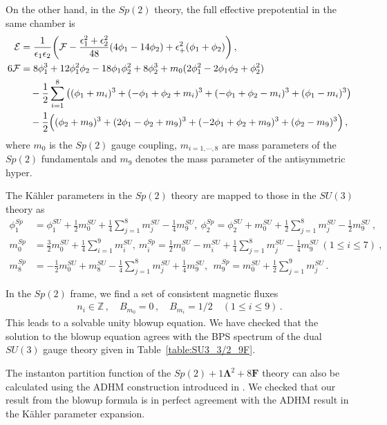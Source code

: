 On the other hand, in the $ Sp(2) $ theory, the full effective prepotential in the same chamber is
\begin{align}
\mathcal{E}& = \frac{1}{\epsilon_1 \epsilon_2} \qty(\mathcal{F} - \frac{\epsilon_1^2 + \epsilon_2^2}{48} \qty(4\phi_1 - 14\phi_2) +  \epsilon_+^2 (\phi_1 + \phi_2) ) \,,  \\
6\mathcal{F}
&= 8\phi_1^3 + 12\phi_1^2 \phi_2 - 18\phi_1 \phi_2^2 + 8\phi_2^3 + m_0 (2\phi_1^2 - 2\phi_1 \phi_2 + \phi_2^2)  \nonumber \\
& \quad - \frac{1}{2} \sum_{i=1}^8 \qty((\phi_1 + m_i)^3 + (-\phi_1 + \phi_2 + m_i)^3 + (-\phi_1 + \phi_2 - m_i)^3 + (\phi_1 - m_i)^3) \nonumber \\
& \quad - \frac{1}{2} \Big((\phi_2 + m_9)^3 + (2\phi_1 - \phi_2 + m_9)^3 + (-2\phi_1 + \phi_2 + m_9)^3 + (\phi_2 - m_9)^3\Big) \nonumber \, ,
\end{align}
where $ m_0 $ is the $Sp(2)$ gauge coupling, $ m_{i=1, \cdots, 8} $ are mass parameters of the $Sp(2)$ fundamentals and $ m_9 $ denotes the mass parameter of the antisymmetric hyper.

The K\"ahler parameters in the $Sp(2)$ theory are mapped to those in the $ SU(3) $ theory as
\begin{align}
\phi_1^{Sp} &= \phi_1^{SU} + \frac{1}{2} m_0^{SU} + \frac{1}{4} \sum_{j=1}^8 m_j^{SU} - \frac{1}{4} m_9^{SU} , \
\phi_2^{Sp} = \phi_2^{SU} + m_0^{SU} + \frac{1}{2} \sum_{j=1}^8 m_j^{SU} - \frac{1}{2} m_9^{SU}\ , \nonumber \\
m_0^{Sp} &= \frac{3}{2} m_0^{SU} + \frac{1}{4} \sum_{i=1}^9 m_i^{SU} , \ 
m_i^{Sp} = \frac{1}{2} m_0^{SU} - m_i^{SU} + \frac{1}{4} \sum_{j=1}^8 m_j^{SU} - \frac{1}{4} m_9^{SU} \ (1 \leq i \leq 7)\ ,  \nonumber \\
m_8^{Sp} &= -\frac{1}{2} m_0^{SU} + m_8^{SU} - \frac{1}{4} \sum_{j=1}^8 m_j^{SU} + \frac{1}{4} m_9^{SU} , \ \
m_9^{Sp} = m_0^{SU} + \frac{1}{2} \sum_{j=1}^9 m^{SU}_j \, .
\end{align}

In the $Sp(2)$ frame, we find a set of consistent magnetic fluxes
\begin{align}
n_i \in \mathbb{Z} \, , \quad
B_{m_0} = 0 \, , \quad
B_{m_i} = 1/2 \quad  (1 \leq i \leq 9) \, .
\end{align}
This leads to a solvable unity blowup equation. We have checked that the solution to the blowup equation agrees with the BPS spectrum of the dual $SU(3)$ gauge theory given in Table~\ref{table:SU3_3/2_9F}.

The instanton partition function of the $ Sp(2) + 1\mathbf{\Lambda}^2 + 8\mathbf{F} $ theory can also be calculated using the ADHM construction introduced in \cite{Aharony:1997pm, Kim:2012gu, Hwang:2014uwa}. We checked that our result from the blowup formula is in perfect agreement with the ADHM result in the K\"ahler parameter expansion.


